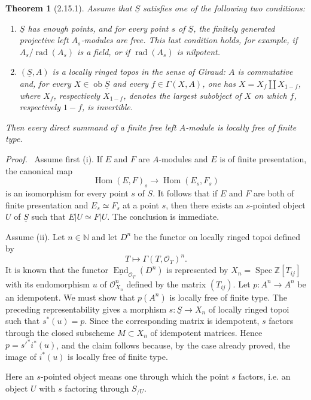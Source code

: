 \documentclass[13pt]{extarticle}
\newcommand{\ZZ}{\mathbb Z}
\newcommand{\NN}{\mathbb N}
\newcommand{\cO}{\mathcal O}
\newcommand{\uS}{\underline S}
\newcommand{\ob}{\operatorname{ob}}
\newcommand{\Hom}{\operatorname{Hom}}
\newcommand{\Spec}{\operatorname{Spec}}
\newcommand{\Rad}{\operatorname{rad}}
\newenvironment{prooftext}[1][Proof]{\par\noindent\emph{#1.}\ }{\par\medskip}
\newtheorem*{theorem*}{Theorem}
\begin{document}
\begin{theorem*}[2.15.1]
Assume that $\uS$ satisfies one of the following two conditions:
\begin{enumerate}[label=(\roman*)]
\item $\uS$ has enough points, and for every point $s$ of $\uS$, the finitely generated projective left $A_s$-modules are free. This last condition holds, for example, if $A_s/\Rad(A_s)$ is a field, or if $\Rad(A_s)$ is nilpotent.
\item $(\uS,A)$ is a locally ringed topos in the sense of Giraud: $A$ is commutative and, for every $X\in\ob\uS$ and every $f\in\Gamma(X,A)$, one has $X=X_f\amalg X_{1-f}$, where $X_f$, respectively $X_{1-f}$, denotes the largest subobject of $X$ on which $f$, respectively $1-f$, is invertible.
\end{enumerate}
Then every direct summand of a finite free left $A$-module is locally free of finite type.
\end{theorem*}

\begin{prooftext}
Assume first (i). If $E$ and $F$ are $A$-modules and $E$ is of finite presentation, the canonical map
\[
\Hom(E,F)_s\longrightarrow\Hom(E_s,F_s)
\]
is an isomorphism for every point $s$ of $S$. It follows that if $E$ and $F$ are both of finite presentation and $E_s\simeq F_s$ at a point $s$, then there exists an $s$-pointed object $U$ of $\uS$ such that $E|U\simeq F|U$. The conclusion is immediate.

Assume (ii). Let $n\in\NN$ and let $D^n$ be the functor on locally ringed topoi defined by
\[
T\longmapsto \Gamma(T,\cO_T)^n.
\]
It is known that the functor $\underline{\operatorname{End}}_{\cO_T}(D^n)$ is represented by $X_n=\Spec\ZZ[T_{ij}]$ with its endomorphism $u$ of $\cO_{X_n}^n$ defined by the matrix $(T_{ij})$. Let $p:A^n\to A^n$ be an idempotent. We must show that $p(A^n)$ is locally free of finite type. The preceding representability gives a morphism $s:\uS\to X_n$ of locally ringed topoi such that $s^*(u)=p$. Since the corresponding matrix is idempotent, $s$ factors through the closed subscheme $M\subset X_n$ of idempotent matrices. Hence $p=s'^*i^*(u)$, and the claim follows because, by the case already proved, the image of $i^*(u)$ is locally free of finite type.
\end{prooftext}

Here an $s$-pointed object means one through which the point $s$ factors, i.e. an object $U$ with $s$ factoring through $S_{/U}$.
\end{document}
